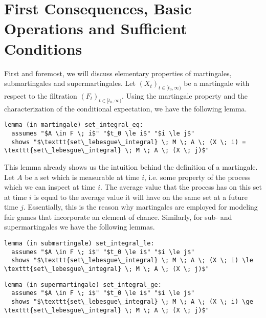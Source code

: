 \section{First Consequences, Basic Operations and Sufficient Conditions}

First and foremost, we will discuss elementary properties of martingales, submartingales and supermartingales. Let $(X_t)_{t \in [t_0,\infty)}$ be a martingale with respect to the filtration $(F_t)_{t \in [t_0,\infty)}$. Using the martingale property and the characterization of the conditional expectation, we have the following lemma.

\begin{isalemma}
{\small
\begin{lstlisting}[style=isabelle]
lemma (in martingale) set_integral_eq:
  assumes "$A \in F \; i$" "$t_0 \le i$" "$i \le j$"
  shows "$\texttt{set\_lebesgue\_integral} \; M \; A \; (X \; i) = \texttt{set\_lebesgue\_integral} \; M \; A \; (X \; j)$"
\end{lstlisting}
}
\end{isalemma}

This lemma already shows us the intuition behind the definition of a martingale. Let $A$ be a set which is measurable at time $i$, i.e. some property of the process which we can inspect at time $i$. The average value that the process has on this set at time $i$ is equal to the average value it will have on the same set at a future time $j$. Essentially, this is the reason why martingales are employed for modeling fair games that incorporate an element of chance. Similarly, for sub- and supermartingales we have the following lemmas.

\begin{isalemma}
{\small
\begin{lstlisting}[style=isabelle]
lemma (in submartingale) set_integral_le:
  assumes "$A \in F \; i$" "$t_0 \le i$" "$i \le j$"
  shows "$\texttt{set\_lebesgue\_integral} \; M \; A \; (X \; i) \le \texttt{set\_lebesgue\_integral} \; M \; A \; (X \; j)$"
\end{lstlisting}
}
\end{isalemma}

\begin{isalemma}
{\small
\begin{lstlisting}[style=isabelle]
lemma (in supermartingale) set_integral_ge:
  assumes "$A \in F \; i$" "$t_0 \le i$" "$i \le j$"
  shows "$\texttt{set\_lebesgue\_integral} \; M \; A \; (X \; i) \ge \texttt{set\_lebesgue\_integral} \; M \; A \; (X \; j)$"
\end{lstlisting}
}
\end{isalemma}

